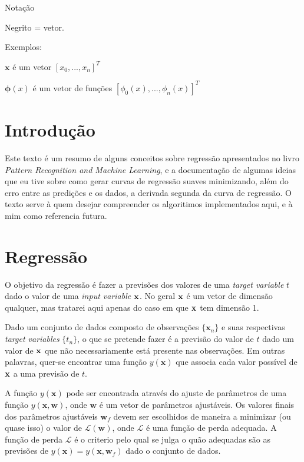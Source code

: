 \documentclass{article}
\begin{document}
Notação

Negrito = vetor.

Exemplos:

\(\textbf{x}\) é um vetor \([x_0,...,x_n]^T\)

\(\boldsymbol{\phi}(x)\) é um vetor de funções \([\phi_0(x),...,\phi_n(x)]^T\)

\section{Introdução}

Este texto é um resumo de alguns conceitos sobre regressão apresentados no livro \emph{Pattern Recognition and Machine Learning},
e a documentação de algumas ideias que eu tive sobre como gerar curvas de regressão suaves minimizando, além
do erro entre as predições e os dados, a derivada segunda da curva de regressão. O texto serve à quem
desejar compreender os algoritimos implementados aqui, e à mim como referencia futura.

\section{Regressão}

O objetivo da regressão é fazer a previsões dos valores de uma \emph{target variable} \(t\) dado o valor de uma 
\emph{input variable} \(\bf x\). No geral \(\bf x\) é um vetor de dimensão qualquer, mas tratarei aqui apenas do
caso em que \( \bf x \) tem dimensão 1. 

Dado um conjunto de dados composto de observações \( \{ \textbf{x}_n \} \) e suas respectivas
\emph{target variables} \( \{t_n\} \), o que se pretende fazer é a previsão do valor de \(t\)
dado um valor de \(\bf x\) que não necessariamente está presente nas observações. Em outras palavras,
quer-se encontrar uma função \( y(\textbf{x}) \) que associa cada valor possível de \(\bf x\) a uma previsão de
\(t\).

A função \( y(\textbf{x}) \) pode ser encontrada através do ajuste de parâmetros de uma função 
\( y(\textbf{x}, \textbf{w}) \), onde \( \textbf{w} \) é um vetor de parâmetros ajustáveis. Os valores
finais dos parâmetros ajustáveis \( \textbf{w}_f \) devem ser escolhidos de maneira a minimizar
(ou quase isso) o valor de \( \mathcal{L}(\textbf{w}) \), onde \( \mathcal{L} \) é uma função de perda
adequada. A função de perda \( \mathcal{L} \) é o criterio pelo qual se julga o quão adequadas são as
previsões de \( y(\textbf{x}) = y(\textbf{x}, \textbf{w}_f) \) dado o conjunto de dados.
\end{document}
